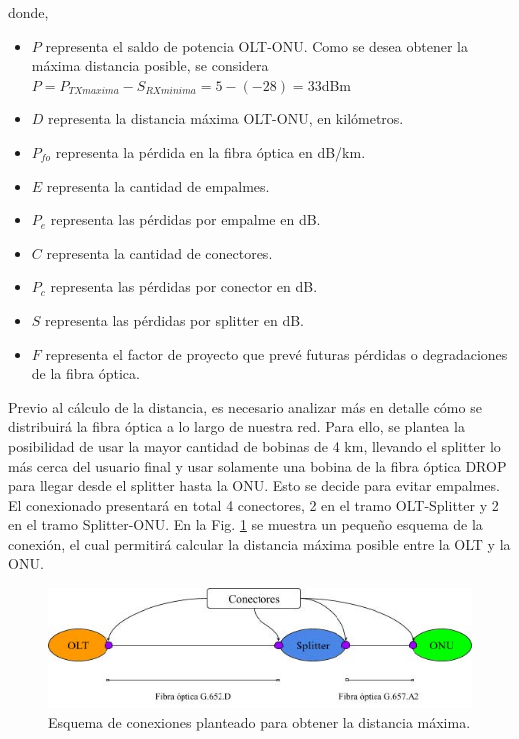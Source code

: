 \documentclass[11pt,a4paper]{article}
\begin{document}
donde,

\begin{itemize}
\item  $P$ representa el saldo de potencia OLT-ONU. Como se desea obtener la máxima distancia posible, se considera $P=P_{TXmaxima}-S_{RXminima}=5-(-28)=33$dBm
\item  $D$ representa la distancia máxima OLT-ONU, en kilómetros.
\item  $P_{fo}$ representa la pérdida en la fibra óptica en dB/km.
\item  $E$ representa la cantidad de empalmes.
\item  $P_e$ representa las pérdidas por empalme en dB.
\item  $C$ representa la cantidad de conectores.
\item  $P_c$ representa las pérdidas por conector en dB.
\item  $S$ representa las pérdidas por splitter en dB.
\item  $F$ representa el factor de proyecto que prevé futuras pérdidas o degradaciones de la fibra óptica.
\end{itemize}

Previo al cálculo de la distancia, es necesario analizar más en detalle cómo se distribuirá la fibra óptica a lo largo de nuestra red. 
Para ello, se plantea la posibilidad de usar la mayor cantidad de bobinas de 4 km, llevando el splitter lo más cerca del usuario final y usar solamente una bobina de la fibra óptica DROP para llegar desde el splitter hasta la ONU. 
Esto se decide para evitar empalmes. 
El conexionado presentará en total 4 conectores, 2 en el tramo OLT-Splitter y 2 en el tramo Splitter-ONU. 
En la Fig. \ref{fig:esq_dist_max} se muestra un pequeño esquema de la conexión, el cual permitirá calcular la distancia máxima posible entre la OLT y la ONU.

\begin{figure}[htbp]
  \centering
  \includegraphics[width=0.8\linewidth]{fotos_ema/esq_dist_max.jpg}
  \caption{Esquema de conexiones planteado para obtener la distancia máxima.}
  \label{fig:esq_dist_max}
\end{figure}
\end{document}
